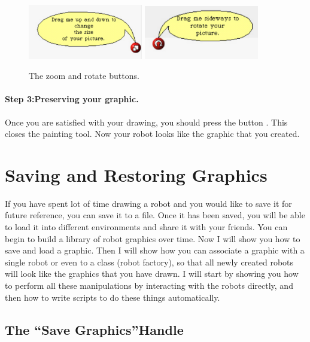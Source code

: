 \documentclass[a4paper,10pt,twoside]{book}
\begin{document}
\begin{figure}[h]
\begin{center}
\includegraphics[width=5cm]{zoomButton} \includegraphics[width=5cm]{rotateButton}
\end{center}
\caption{The zoom and rotate buttons. \label{fig:zoomandrotate}}
\end{figure}


\paragraph{Step 3:Preserving your graphic.}
Once you are satisfied with your drawing, you should 
press the button . This closes the painting tool. Now your robot looks like the graphic 
that you created. 

\section{Saving and Restoring Graphics}

If you have spent lot of time drawing a robot and you would like to save it for future reference, 
you can save it to a file. Once it has been saved, you will be able to load it into different 
environments and share it with your friends. You can begin to build a library of robot graphics over 
time. Now I will show you how to save and load a graphic. Then I will show how you can associate 
a graphic with a single robot or even to a class (robot factory), so that all newly created 
robots will look like the graphics that you have drawn. I will start by showing you how to 
perform all these manipulations by interacting with the robots directly, and then how to write 
scripts to do these things automatically.


\subsection{The “Save Graphics”Handle}
\end{document}
